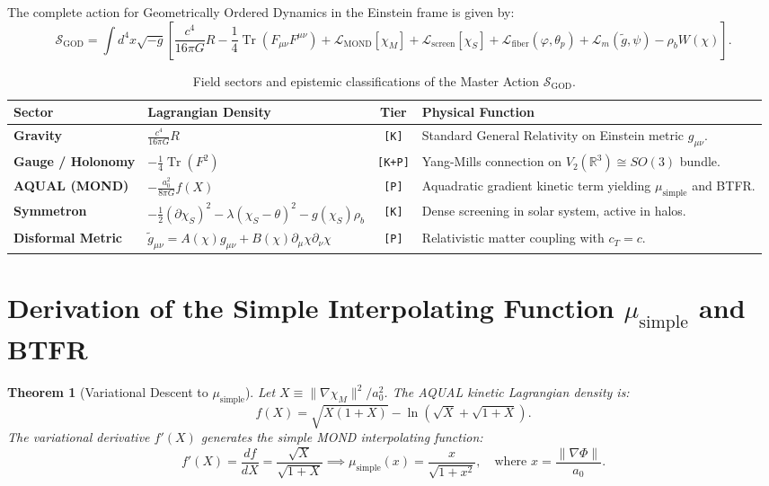 \documentclass[11pt,a4paper]{article}
\theoremstyle{plain}
\newtheorem{theorem}{Theorem}[section]
\theoremstyle{definition}
\theoremstyle{remark}
\begin{document}
The complete action for Geometrically Ordered Dynamics in the Einstein frame is given by:
\begin{equation}
\mathcal{S}_{\text{GOD}} = \int d^4x \sqrt{-g} \left[ \frac{c^4}{16\pi G} R - \frac{1}{4} \operatorname{Tr}(F_{\mu\nu} F^{\mu\nu}) + \mathcal{L}_{\text{MOND}}[\chi_M] + \mathcal{L}_{\text{screen}}[\chi_S] + \mathcal{L}_{\text{fiber}}(\varphi, \theta_p) + \mathcal{L}_m(\tilde{g}, \psi) - \rho_b W(\chi) \right].
\end{equation}

\begin{table}[h!]
\centering
\small
\renewcommand{\arraystretch}{1.2}
\begin{tabularx}{\textwidth}{llcX}
\toprule
\textbf{Sector} & \textbf{Lagrangian Density} & \textbf{Tier} & \textbf{Physical Function} \\
\midrule
\textbf{Gravity} & $\frac{c^4}{16\pi G} R$ & \texttt{[K]} & Standard General Relativity on Einstein metric $g_{\mu\nu}$. \\
\textbf{Gauge / Holonomy} & $-\frac{1}{4} \operatorname{Tr}(F^2)$ & \texttt{[K+P]} & Yang-Mills connection on $V_2(\mathbb{R}^3) \cong SO(3)$ bundle. \\
\textbf{AQUAL (MOND)} & $-\frac{a_0^2}{8\pi G} f(X)$ & \texttt{[P]} & Aquadratic gradient kinetic term yielding $\mu_{\text{simple}}$ and BTFR. \\
\textbf{Symmetron} & $-\frac{1}{2}(\partial \chi_S)^2 - \lambda(\chi_S - \theta)^2 - g(\chi_S)\rho_b$ & \texttt{[K]} & Dense screening in solar system, active in halos. \\
\textbf{Disformal Metric} & $\tilde{g}_{\mu\nu} = A(\chi) g_{\mu\nu} + B(\chi) \partial_\mu \chi \partial_\nu \chi$ & \texttt{[P]} & Relativistic matter coupling with $c_T = c$. \\
\bottomrule
\end{tabularx}
\caption{Field sectors and epistemic classifications of the Master Action $\mathcal{S}_{\text{GOD}}$.}
\end{table}

\section{Derivation of the Simple Interpolating Function $\mu_{\text{simple}}$ and BTFR}

\begin{theorem}[Variational Descent to $\mu_{\text{simple}}$]
Let $X \equiv \|\nabla \chi_M\|^2 / a_0^2$. The AQUAL kinetic Lagrangian density is:
\begin{equation}
f(X) = \sqrt{X(1 + X)} - \ln\left(\sqrt{X} + \sqrt{1 + X}\right).
\end{equation}
The variational derivative $f'(X)$ generates the simple MOND interpolating function:
\begin{equation}
f'(X) = \frac{d f}{d X} = \frac{\sqrt{X}}{\sqrt{1 + X}} \implies \mu_{\text{simple}}(x) = \frac{x}{\sqrt{1 + x^2}}, \quad \text{where } x = \frac{\|\nabla \Phi\|}{a_0}.
\end{equation}
\end{theorem}
\end{document}
